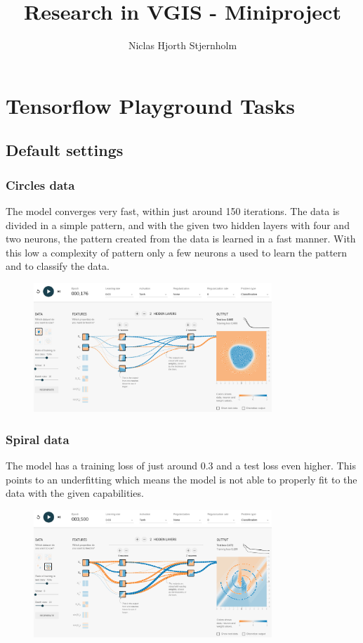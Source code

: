 \documentclass{article}
\begin{document}
\title{Research in VGIS - Miniproject}
\author{Niclas Hjorth Stjernholm}

\maketitle

\section{Tensorflow Playground Tasks}
\subsection{Default settings}
\subsubsection*{Circles data}
The model converges very fast, within just around 150 iterations.
The data is divided in a simple pattern, and with the given two hidden layers with four and two neurons, the pattern created from the data is learned in a fast manner. With this low a complexity of pattern only a few neurons a used to learn the pattern and to classify the data.

\begin{figure}[h]
  \centering
  \includegraphics[width=0.8\textwidth]{default.png}
\end{figure}

\subsubsection*{Spiral data}
The model has a training loss of just around $0.3$ and a test loss even higher. This points to an underfitting which means the model is not able to properly fit to the data with the given capabilities.

\begin{figure}[h]
  \centering
  \includegraphics[width=0.8\textwidth]{default_spiral.png}
\end{figure}
\end{document}
